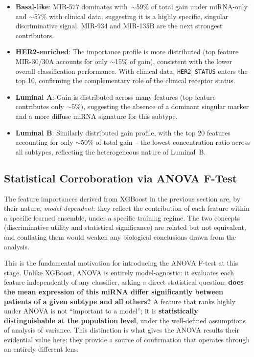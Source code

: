 \begin{itemize}
    \item \textbf{Basal-like}: MIR-577 dominates with~$\sim$59\% of total gain under miRNA-only
    and $\sim$57\% with clinical data, suggesting it is a highly specific, singular discriminative
    signal. MIR-934 and MIR-135B are the next strongest contributors.

    \item \textbf{HER2-enriched}: The importance profile is more distributed (top feature
    MIR-30/30A accounts for only $\sim$15\% of gain), consistent with the lower overall
    classification performance. With clinical data, \texttt{HER2\_STATUS} enters the top 10,
    confirming the complementary role of the clinical receptor status.

    \item \textbf{Luminal A}: Gain is distributed across many features (top feature contributes
    only $\sim$5\%), suggesting the absence of a dominant singular marker and a more diffuse
    miRNA signature for this subtype.

    \item \textbf{Luminal B}: Similarly distributed gain profile, with the top 20 features
    accounting for only $\sim$50\% of total gain -- the lowest concentration ratio across all
    subtypes, reflecting the heterogeneous nature of Luminal~B.
\end{itemize}

\FloatBarrier
\subsection{Statistical Corroboration via ANOVA F-Test}
\label{sec:anova-bridge}
 
The feature importances derived from XGBoost in the previous section are, by their nature,
\textit{model-dependent}: they reflect the contribution of each feature within a specific
learned ensemble, under a specific training regime. The two concepts (discriminative utility and statistical significance)
are related but not equivalent, and conflating them would weaken any biological conclusions
drawn from the analysis.

This is the fundamental motivation for introducing the ANOVA F-test at this stage. Unlike
XGBoost, ANOVA is entirely model-agnostic: it evaluates each feature independently of any
classifier, asking a direct statistical question: \textbf{does the mean expression of this miRNA
differ significantly between patients of a given subtype and all others?} A feature that
ranks highly under ANOVA is not ``important to a model''; it is \textbf{statistically
distinguishable at the population level}, under the well-defined assumptions of analysis
of variance. This distinction is what gives the ANOVA results their evidential value here:
they provide a source of confirmation that operates through an entirely different lens.
 
